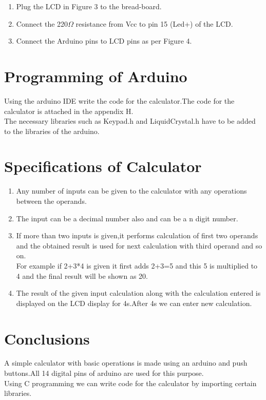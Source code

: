 \documentclass[11pt]{article}
\begin{document}
\begin{enumerate}
		\item Plug the LCD in Figure 3 to the bread-board.
		\item  Connect the 220$\Omega$ resistance from Vcc to pin 15 (Led+) of the LCD.
		\item Connect the Arduino pins to LCD pins as per Figure 4.
		\end{enumerate}

		
\section{Programming of Arduino}
	Using the arduino IDE write the code for the calculator.The code for the calculator is attached in the appendix H.\\
	The necessary libraries such as Keypad.h and LiquidCrystal.h have to be added to the libraries of the arduino.

\section{Specifications of Calculator}
\begin{enumerate}

	\item Any number of inputs can be given to the calculator with any operations between the operands.
	\item The input can be a decimal number also and  can be a n digit number.
	\item If more than two inputs is given,it performs calculation of first two operands and the obtained result is used for next calculation with third operand and so on.\\
	For example if 2+3*4 is given it first adds 2+3=5 and this 5 is multiplied to 4 and the final result will be shown as 20.
	\item The result of the given input calculation along with the calculation entered is displayed on the LCD display for 4s.After 4s we can enter new calculation.
			
\end{enumerate}

\section{Conclusions}
A simple calculator with basic operations is made using an arduino and push buttons.All 14 digital pins of arduino are used for this purpose.\\
Using C programming we can write code for the calculator by importing certain libraries.
		
\end{document}
